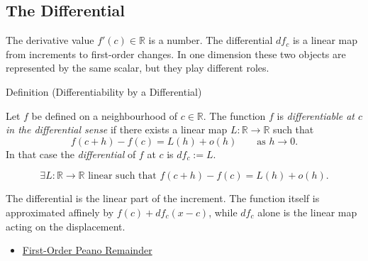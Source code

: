 \subsection{The Differential}
\label{sec:differential}

\begin{remark*}[Interpretation]
The derivative value $f'(c)\in\mathbb{R}$ is a number. The differential $df_c$ is a linear map from increments to first-order changes. In one dimension these two objects are represented by the same scalar, but they play different roles.
\end{remark*}

\begin{definitionbox}{Definition (Differentiability by a Differential)}
\begin{definition}
\label{def:differentiability-by-a-differential}
Let $f$ be defined on a neighbourhood of $c\in\mathbb{R}$. The function $f$ is \emph{differentiable at $c$ in the differential sense} if there exists a linear map $L:\mathbb{R}\to\mathbb{R}$ such that
\[
  f(c+h)-f(c)=L(h)+o(h)
  \qquad\text{as } h\to 0.
\]
In that case the \emph{differential} of $f$ at $c$ is $df_c:=L$.
\end{definition}
\end{definitionbox}

\begin{remark*}
\[
  \exists L:\mathbb{R}\to\mathbb{R}\text{ linear such that }
  f(c+h)-f(c)=L(h)+o(h).
\]
\end{remark*}

\begin{remark*}[Interpretation]
The differential is the linear part of the increment. The function itself is approximated affinely by $f(c)+df_c(x-c)$, while $df_c$ alone is the linear map acting on the displacement.
\end{remark*}

\begin{dependencies}
\begin{itemize}
  \item \hyperref[cor:first-order-peano-remainder]{First-Order Peano Remainder}
\end{itemize}
\end{dependencies}

